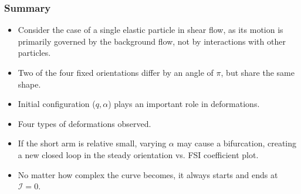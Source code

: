 \documentclass{beamer}
\newcommand{\bi}{\begin{itemize}}
\newcommand{\ei}{\end{itemize}}
\begin{document}
\begin{frame}
\begin{overlayarea}{\textwidth}{\textheight}
\begin{figure}[!h]
{\begin{minipage}[b]{0.25\textwidth}
		\end{minipage}
		\label{fig:10.e}
	}
\end{figure}
	\end{overlayarea}
\end{frame}



\begin{frame}
	\frametitle{Summary}
	\begin{overlayarea}{\textwidth}{\textheight}
	\bi
	\item Consider the case of a single elastic particle in shear flow, as its motion is primarily governed by the background flow, not by interactions with other particles.
	\item Two of the four fixed orientations differ by an angle of $\pi$, but share the same shape.
	\item Initial configuration ($q,\alpha$) plays an important role in deformations.
	\item Four types of deformations observed.
	\item If the short arm is relative small, varying $\alpha$ may cause a bifurcation, creating a new closed loop in the steady orientation vs. FSI coefficient plot.
	\item No matter how complex the curve becomes, it always starts and ends at $\mathcal{I}=0$.
	\ei
	\end{overlayarea}
\end{frame}
\end{document}

